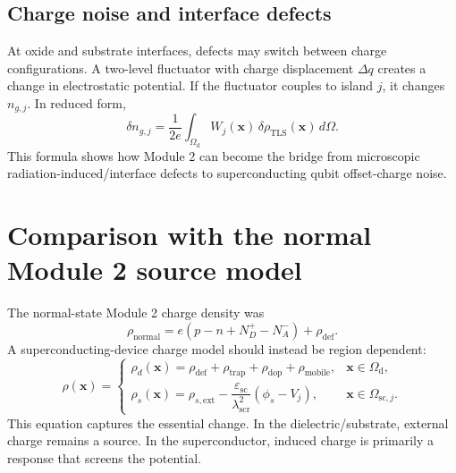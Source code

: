 \documentclass[11pt]{article}
\newcommand{\Omd}{\Omega_{\mathrm{d}}}
\newcommand{\epssc}{\varepsilon_{\mathrm{sc}}}
\newcommand{\rhotrap}{\rho_{\mathrm{trap}}}
\newcommand{\rhodef}{\rho_{\mathrm{def}}}
\newcommand{\lams}{\lambda_{\mathrm{scr}}}
\begin{document}
\subsection{Charge noise and interface defects}

At oxide and substrate interfaces, defects may switch between charge configurations. A two-level fluctuator with charge displacement $\Delta q$ creates a change in electrostatic potential. If the fluctuator couples to island $j$, it changes $n_{g,j}$. In reduced form,
\begin{equation}
\delta n_{g,j}=\frac{1}{2e}\int_{\Omd}W_j(\mathbf{x})\,\delta\rho_{\mathrm{TLS}}(\mathbf{x})\,d\Omega.
\end{equation}
This formula shows how Module 2 can become the bridge from microscopic radiation-induced/interface defects to superconducting qubit offset-charge noise.

\section{Comparison with the normal Module 2 source model}

The normal-state Module 2 charge density was
\begin{equation}
\rho_{\mathrm{normal}}=e(p-n+N_D^+-N_A^-)+\rhodef.
\end{equation}
A superconducting-device charge model should instead be region dependent:
\begin{equation}
\rho(\mathbf{x})=
\begin{cases}
\rho_d(\mathbf{x})=\rhodef+\rhotrap+\rho_{\mathrm{dop}}+\rho_{\mathrm{mobile}}, & \mathbf{x}\in\Omd,\\[0.5em]
\rho_s(\mathbf{x})=\rho_{s,\mathrm{ext}}-\dfrac{\epssc}{\lams^2}(\phi_s-V_j), & \mathbf{x}\in\Omega_{\mathrm{sc},j}.
\end{cases}
\label{eq:region_dependent_charge_model}
\end{equation}
This equation captures the essential change. In the dielectric/substrate, external charge remains a source. In the superconductor, induced charge is primarily a response that screens the potential.
\end{document}
